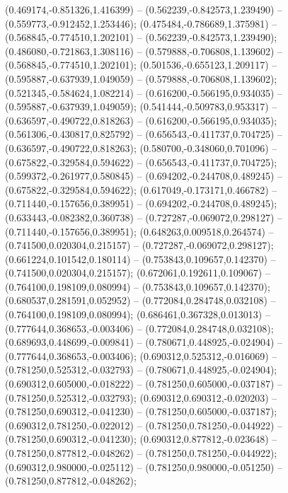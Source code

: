  (0.469174,-0.851326,1.416399) -- (0.562239,-0.842573,1.239490) -- (0.559773,-0.912452,1.253446);
 (0.475484,-0.786689,1.375981) -- (0.568845,-0.774510,1.202101) -- (0.562239,-0.842573,1.239490);
 (0.486080,-0.721863,1.308116) -- (0.579888,-0.706808,1.139602) -- (0.568845,-0.774510,1.202101);
 (0.501536,-0.655123,1.209117) -- (0.595887,-0.637939,1.049059) -- (0.579888,-0.706808,1.139602);
 (0.521345,-0.584624,1.082214) -- (0.616200,-0.566195,0.934035) -- (0.595887,-0.637939,1.049059);
 (0.541444,-0.509783,0.953317) -- (0.636597,-0.490722,0.818263) -- (0.616200,-0.566195,0.934035);
 (0.561306,-0.430817,0.825792) -- (0.656543,-0.411737,0.704725) -- (0.636597,-0.490722,0.818263);
 (0.580700,-0.348060,0.701096) -- (0.675822,-0.329584,0.594622) -- (0.656543,-0.411737,0.704725);
 (0.599372,-0.261977,0.580845) -- (0.694202,-0.244708,0.489245) -- (0.675822,-0.329584,0.594622);
 (0.617049,-0.173171,0.466782) -- (0.711440,-0.157656,0.389951) -- (0.694202,-0.244708,0.489245);
 (0.633443,-0.082382,0.360738) -- (0.727287,-0.069072,0.298127) -- (0.711440,-0.157656,0.389951);
 (0.648263,0.009518,0.264574) -- (0.741500,0.020304,0.215157) -- (0.727287,-0.069072,0.298127);
 (0.661224,0.101542,0.180114) -- (0.753843,0.109657,0.142370) -- (0.741500,0.020304,0.215157);
 (0.672061,0.192611,0.109067) -- (0.764100,0.198109,0.080994) -- (0.753843,0.109657,0.142370);
 (0.680537,0.281591,0.052952) -- (0.772084,0.284748,0.032108) -- (0.764100,0.198109,0.080994);
 (0.686461,0.367328,0.013013) -- (0.777644,0.368653,-0.003406) -- (0.772084,0.284748,0.032108);
 (0.689693,0.448699,-0.009841) -- (0.780671,0.448925,-0.024904) -- (0.777644,0.368653,-0.003406);
 (0.690312,0.525312,-0.016069) -- (0.781250,0.525312,-0.032793) -- (0.780671,0.448925,-0.024904);
 (0.690312,0.605000,-0.018222) -- (0.781250,0.605000,-0.037187) -- (0.781250,0.525312,-0.032793);
 (0.690312,0.690312,-0.020203) -- (0.781250,0.690312,-0.041230) -- (0.781250,0.605000,-0.037187);
 (0.690312,0.781250,-0.022012) -- (0.781250,0.781250,-0.044922) -- (0.781250,0.690312,-0.041230);
 (0.690312,0.877812,-0.023648) -- (0.781250,0.877812,-0.048262) -- (0.781250,0.781250,-0.044922);
 (0.690312,0.980000,-0.025112) -- (0.781250,0.980000,-0.051250) -- (0.781250,0.877812,-0.048262);
